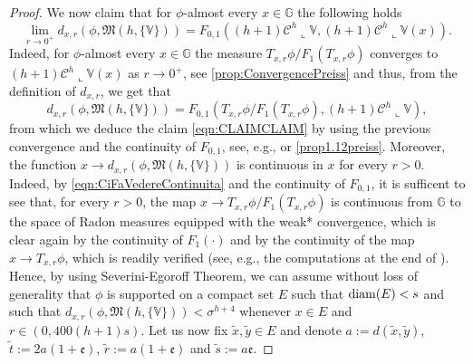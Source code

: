 \documentclass[10pt, a4paper,
oneside, headinclude,footinclude]{scrartcl}
\begin{document}
\begin{proof}
We now claim that for $\phi$-almost every $x\in\mathbb G$ the following holds
 \begin{equation}\label{eqn:CLAIMCLAIM}
 \lim_{r\to 0^+}d_{x,r}(\phi,\mathfrak{M}(h,\{\mathbb V\}))= F_{0,1}((h+1)\mathcal{C}^h\llcorner \mathbb{V},(h+1)\mathcal{C}^h\llcorner \mathbb{V}(x)).
 \end{equation}
 Indeed, for $\phi$-almost every $x\in\mathbb G$ the measure $T_{x,r}\phi/F_1(T_{x,r}\phi)$ converges to $(h+1)\mathcal{C}^h\llcorner \mathbb V(x)$ as $r\to 0^+$, see \cref{prop:ConvergencePreiss} and thus, from the definition of $d_{x,r}$, we get that 
 \begin{equation}\label{eqn:CiFaVedereContinuita}
 d_{x,r}(\phi,\mathfrak{M}(h,\{\mathbb V\}))=F_{0,1}(T_{x,r}\phi/F_1(T_{x,r}\phi),(h+1)\mathcal{C}^h\llcorner\mathbb V),
 \end{equation}
 from which we deduce the claim \eqref{eqn:CLAIMCLAIM} by using the previous convergence and the continuity of $F_{0,1}$, see, e.g., \cite[Proposition 1.10]{MarstrandMattila20} or \cref{prop1.12preiss}. Moreover, the function $x\to d_{x,r}(\phi,\mathfrak{M}(h,\{\mathbb V\}))$ is continuous in $x$ for every $r>0$. Indeed, by \eqref{eqn:CiFaVedereContinuita} and the continuity of $F_{0,1}$, it is sufficent to see that, for every $r>0$, the map $x\to T_{x,r}\phi/F_1(T_{x,r}\phi)$ is continuous from $\mathbb G$ to the space of Radon measures equipped with the weak* convergence, which is clear again by the continuity of $F_1(\cdot)$ and by the continuity of the map $x\to T_{x,r}\phi$, which is readily verified (see, e.g., the computations at the end of \cite[page 22]{MarstrandMattila20}). Hence, by using Severini-Egoroff Theorem, we can assume without loss of generality that $\phi$ is supported on a compact set $E$ such that $\operatorname*{diam}(E)<s$ and such that  $d_{x,r}(\phi,\mathfrak{M}(h,\{\mathbb{V}\}))<\sigma^{h+4}$ whenever $ x\in E$ and $r\in(0,400(h+1)s)$. Let us now fix $\widetilde x,\widetilde y\in E$ and denote $a:=d(\widetilde x,\widetilde y)$, $\widetilde t:=2a(1+\mathfrak e)$, $\widetilde r:=a(1+\mathfrak e)$ and $\widetilde s:=a\mathfrak e$.
 

\end{proof}
\end{document}
